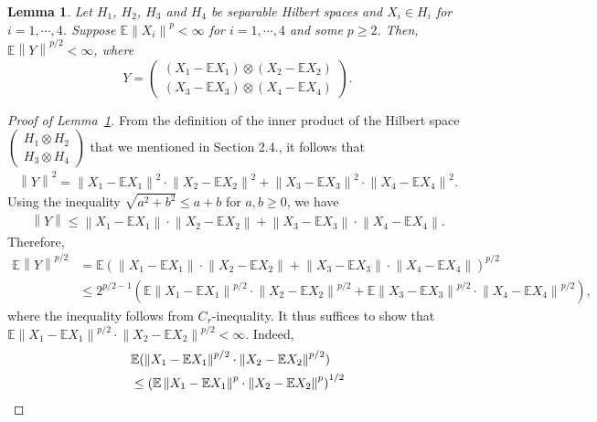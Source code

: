 \documentclass[11pt]{article}
\newcommand{\bE}{\mathbb{E}}
\theoremstyle{plain}
\newtheorem{lemma}[theorem]{Lemma}
\theoremstyle{definition}
\theoremstyle{remark}
\begin{document}
\begin{appendix}
\begin{lemma}\label{lemma:HS_norm_finite}
    Let $H_1$, $H_2$, $H_3$ and $H_4$ be separable Hilbert spaces and $X_i\in H_i$ for $i=1,\cdots,4$. Suppose $\bE \left\|X_i\right\|^{p}<\infty$ for $i=1,\cdots,4$ and some $p\geq 2$. Then, $\bE \left\|Y\right\|^{p/2}<\infty$, where
    $$Y=\begin{pmatrix}
       (X_1-\bE X_1)\otimes  (X_2-\bE X_2)\\
       (X_3-\bE X_3)\otimes  (X_4-\bE X_4)
    \end{pmatrix}.$$
\end{lemma}
\begin{proof}[Proof of Lemma~\ref{lemma:HS_norm_finite}]
From the definition of the inner product of the Hilbert space  $\begin{pmatrix}
       H_1\otimes  H_2\\
       H_3\otimes  H_4
    \end{pmatrix}$ that we mentioned in Section 2.4., it follows that
\begin{align*}
    \left\|Y\right\|^2= \left\|X_1-\bE X_1\right\|^2\cdot \left\|X_2-\bE X_2\right\|^2+\left\|X_3-\bE X_3\right\|^2\cdot \left\|X_4-\bE X_4\right\|^2.
 \end{align*}
 Using the inequality $\sqrt{a^2+b^2}\leq a+b$ for $a,b\geq 0$, we have 
 \begin{align*}
     \left\|Y\right\|\leq \left\|X_1-\bE X_1\right\|\cdot \left\|X_2-\bE X_2\right\|+\left\|X_3-\bE X_3\right\|\cdot \left\|X_4-\bE X_4\right\|.
 \end{align*}
    Therefore,
    \begin{align*}
        \bE \left\|Y\right\|^{p/2}&=\bE\left(\left\|X_1-\bE X_1\right\|\cdot \left\|X_2-\bE X_2\right\|+\left\|X_3-\bE X_3\right\|\cdot \left\|X_4-\bE X_4\right\|\right)^{p/2}\\
        &\leq 2^{p/2-1}\left(\bE\left\|X_1-\bE X_1\right\|^{p/2}\cdot \left\|X_2-\bE X_2\right\|^{p/2}+\bE\left\|X_3-\bE X_3\right\|^{p/2}\cdot \left\|X_4-\bE X_4\right\|^{p/2}\right),
    \end{align*}
    where the inequality follows from $C_r$-inequality. It thus suffices to show that $\bE\left\|X_1-\bE X_1\right\|^{p/2}\cdot \left\|X_2-\bE X_2\right\|^{p/2}<\infty.$ Indeed,
    \begin{align*}
         &\bE (\left\|X_1-\bE X_1\right\|^{p/2}\cdot \left\|X_2-\bE X_2\right\|^{p/2})\\
         &\leq \left(\bE \left\|X_1-\bE X_1\right\|^{p}\cdot \left\|X_2-\bE X_2\right\|^{p}\right)^{1/2}\allowdisplaybreaks\\

\end{align*}
\end{proof}
\end{appendix}
\end{document}
